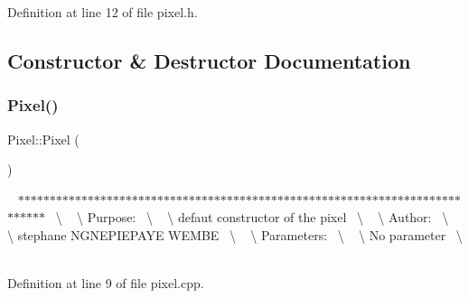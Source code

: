 Definition at line 12 of file pixel.\+h.



\subsection{Constructor \& Destructor Documentation}
\mbox{\label{class_pixel_a27ad99a2f705e635c42d242d530d4756}} 
\subsubsection{\texorpdfstring{Pixel()}{Pixel()}}
{\footnotesize\ttfamily Pixel\+::\+Pixel (\begin{DoxyParamCaption}{ }\end{DoxyParamCaption})}

~\newline
$\ast$$\ast$$\ast$$\ast$$\ast$$\ast$$\ast$$\ast$$\ast$$\ast$$\ast$$\ast$$\ast$$\ast$$\ast$$\ast$$\ast$$\ast$$\ast$$\ast$$\ast$$\ast$$\ast$$\ast$$\ast$$\ast$$\ast$$\ast$$\ast$$\ast$$\ast$$\ast$$\ast$$\ast$$\ast$$\ast$$\ast$$\ast$$\ast$$\ast$$\ast$$\ast$$\ast$$\ast$$\ast$$\ast$$\ast$$\ast$$\ast$$\ast$$\ast$$\ast$$\ast$$\ast$$\ast$$\ast$$\ast$$\ast$$\ast$$\ast$$\ast$$\ast$$\ast$$\ast$$\ast$$\ast$$\ast$$\ast$$\ast$$\ast$$\ast$$\ast$$\ast$$\ast$$\ast$$\ast$~\newline
\textbackslash{} ~\newline
\textbackslash{} Purpose\+:~\newline
\textbackslash{} ~\newline
\textbackslash{} defaut constructor of the pixel~\newline
\textbackslash{} ~\newline
\textbackslash{} Author\+:~\newline
\textbackslash{} ~\newline
\textbackslash{} stephane N\+G\+N\+E\+P\+I\+E\+P\+A\+YE W\+E\+M\+BE~\newline
\textbackslash{} ~\newline
\textbackslash{} Parameters\+:~\newline
\textbackslash{} ~\newline
\textbackslash{} No parameter~\newline
\textbackslash{} ~\newline


Definition at line 9 of file pixel.\+cpp.

